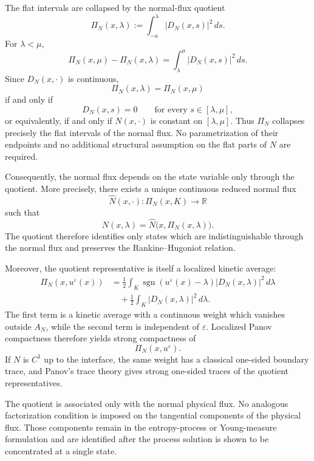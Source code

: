 \documentclass[11pt]{amsart}
\numberwithin{equation}{section}
\theoremstyle{plain}
\theoremstyle{definition}
\theoremstyle{remark}
\begin{document}
The flat intervals are collapsed by the normal-flux quotient
\begin{equation}
\label{eq:intro-normal-flux-quotient}
    \Pi_N(x,\lambda)
    :=
    \int_{-a}^{\lambda}
        |D_N(x,s)|^2\,ds.
\end{equation}
For \(\lambda<\mu\),
\[
    \Pi_N(x,\mu)-\Pi_N(x,\lambda)
    =
    \int_\lambda^\mu
        |D_N(x,s)|^2\,ds.
\]
Since \(D_N(x,\cdot)\) is continuous,
\[
    \Pi_N(x,\lambda)=\Pi_N(x,\mu)
\]
if and only if
\[
    D_N(x,s)=0
    \qquad
    \text{for every }s\in[\lambda,\mu],
\]
or equivalently, if and only if \(N(x,\cdot)\) is constant on
\([\lambda,\mu]\).  Thus \(\Pi_N\) collapses precisely the flat intervals of
the normal flux.  No parametrization of their endpoints and no additional
structural assumption on the flat parts of \(N\) are required.

Consequently, the normal flux depends on the state variable only through the
quotient.  More precisely, there exists a unique continuous reduced normal
flux
\[
    \widehat N(x,\cdot):
    \Pi_N(x,K)\to\mathbb R
\]
such that
\[
    N(x,\lambda)
    =
    \widehat N\bigl(x,\Pi_N(x,\lambda)\bigr).
\]
The quotient therefore identifies only states which are indistinguishable
through the normal flux and preserves the Rankine--Hugoniot relation.

Moreover, the quotient representative is itself a localized kinetic average:
\[
\begin{aligned}
    \Pi_N(x,u^\varepsilon(x))
    &=
    \frac12
    \int_K
        \operatorname{sgn}(u^\varepsilon(x)-\lambda)
        |D_N(x,\lambda)|^2\,d\lambda
\\
    &\quad+
    \frac12
    \int_K
        |D_N(x,\lambda)|^2\,d\lambda.
\end{aligned}
\]
The first term is a kinetic average with a continuous weight which vanishes
outside \(A_N\), while the second term is independent of
\(\varepsilon\).  Localized Panov compactness therefore yields strong
compactness of
\[
    \Pi_N(x,u^\varepsilon).
\]
If \(N\) is \(C^1\) up to the interface, the same weight has a classical
one-sided boundary trace, and Panov's trace theory gives strong one-sided
traces of the quotient representatives.

The quotient is associated only with the normal physical flux.  No analogous
factorization condition is imposed on the tangential components of the
physical flux.  Those components remain in the entropy-process or
Young-measure formulation and are identified after the process solution is
shown to be concentrated at a single state.
\end{document}
